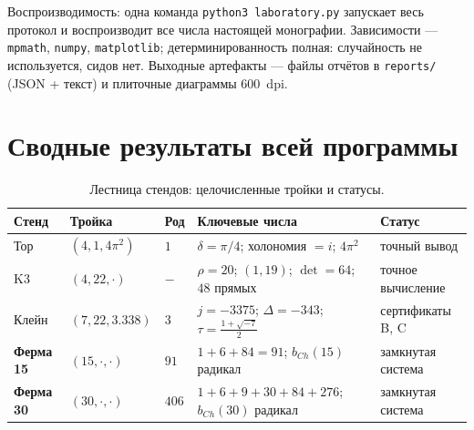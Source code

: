Воспроизводимость: одна команда \texttt{python3 laboratory.py}
запускает весь протокол и воспроизводит все числа настоящей
монографии. Зависимости --- \texttt{mpmath}, \texttt{numpy},
\texttt{matplotlib}; детерминированность полная: случайность не
используется, сидов нет. Выходные артефакты --- файлы отчётов в
\texttt{reports/} (JSON + текст) и плиточные диаграммы $600$~dpi.

\section{Сводные результаты всей программы}\label{sec:summary}

\begin{table}[t]
\centering
\caption{Лестница стендов: целочисленные тройки и статусы.}
\label{tab:ladder-full}
\small
\begin{tabularx}{\textwidth}{@{}l l l l >{\raggedright\arraybackslash}X@{}}
\toprule
Стенд & Тройка & Род & Ключевые числа & Статус \\
\midrule
Тор & $(4,1,4\pi^2)$ & $1$ & $\delta=\pi/4$; холономия $=i$;
  $4\pi^2$ & точный вывод \\
K3 & $(4,22,\cdot)$ & $-$ & $\rho=20$; $(1,19)$; $\det=64$;
  $48$ прямых & точное вычисление \\
Клейн & $(7,22,3.338)$ & $3$ & $j=-3375$; $\Delta=-343$;
  $\tau=\tfrac{1+\sqrt{-7}}2$ & сертификаты B, C \\
\textbf{Ферма 15} & $(15,\cdot,\cdot)$ & $91$ &
  $1+6+84=91$; $b_{Ch}(15)$ радикал & замкнутая система \\
\textbf{Ферма 30} & $(30,\cdot,\cdot)$ & $406$ &
  $1+6+9+30+84+276$; $b_{Ch}(30)$ радикал & замкнутая система \\
\bottomrule
\end{tabularx}
\end{table}

